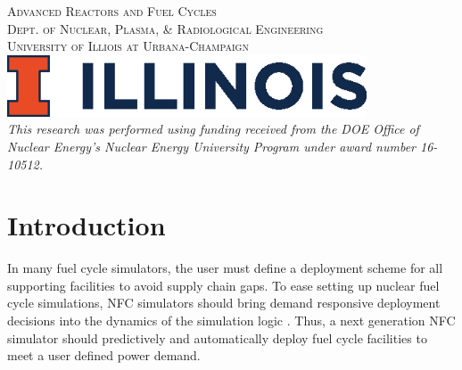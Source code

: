 \documentclass[11pt]{article}
\begin{document}
\begin{titlepage}
    \textsc{\LARGE Advanced Reactors and Fuel Cycles}\\[0.25cm] %

    \textsc{\large Dept. of Nuclear, Plasma, \& Radiological Engineering}\\%

    \textsc{\large University of Illiois at Urbana-Champaign}\\ %




    \vspace{0.5cm}
    \includegraphics[width=0.8\textwidth]{illinois}\\[1cm] %


    \textit{This research was performed using funding received from the
    DOE Office of Nuclear Energy's Nuclear Energy University Program under
    award number 16-10512.}

\end{titlepage}

\section{Introduction}
In many fuel cycle simulators, the user
must define a deployment scheme for all supporting facilities to avoid supply 
chain gaps.
To ease setting up nuclear fuel cycle simulations, \gls{NFC}
simulators should bring demand responsive deployment decisions into 
the dynamics of the simulation logic \cite{huff_current_2017}. 
Thus, a next generation \gls{NFC} simulator should predictively and 
automatically deploy fuel cycle facilities to meet a user defined 
power demand. 
\end{document}
